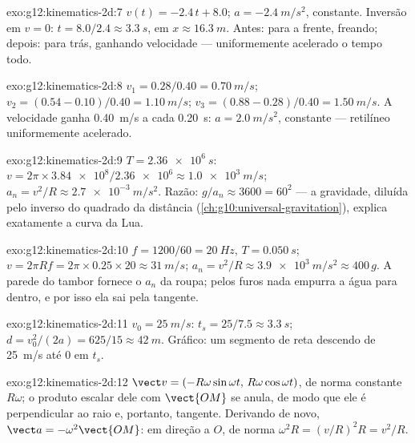 \begin{solution}{exo:g12:kinematics-2d:7}
$v(t) = -2.4\,t + 8.0$; $a = \qty{-2.4}{m/s^2}$, constante. Inversão em
$v = 0$: $t = 8.0/2.4 \approx \qty{3.3}{s}$, em
$x \approx \qty{16.3}{m}$. Antes: para a frente, freando; depois: para
trás, ganhando velocidade --- uniformemente acelerado o tempo todo.
\end{solution}

\begin{solution}{exo:g12:kinematics-2d:8}
$v_1 = 0.28/0.40 = \qty{0.70}{m/s}$;
$v_2 = (0.54 - 0.10)/0.40 = \qty{1.10}{m/s}$;
$v_3 = (0.88 - 0.28)/0.40 = \qty{1.50}{m/s}$. A velocidade ganha
\qty{0.40}{m/s} a cada \qty{0.20}{s}: $a = \qty{2.0}{m/s^2}$, constante
--- retilíneo uniformemente acelerado.
\end{solution}

\begin{solution}{exo:g12:kinematics-2d:9}
$T = \qty{2.36e6}{s}$:
$v = 2\pi \times \num{3.84e8}/\num{2.36e6} \approx \qty{1.0e3}{m/s}$;
$a_n = v^2/R \approx \qty{2.7e-3}{m/s^2}$. Razão:
$g/a_n \approx 3600 = 60^2$ --- a gravidade, diluída pelo inverso do
quadrado da distância (\cref{ch:g10:universal-gravitation}), explica
exatamente a curva da Lua.
\end{solution}

\begin{solution}{exo:g12:kinematics-2d:10}
$f = 1200/60 = \qty{20}{Hz}$, $T = \qty{0.050}{s}$;
$v = 2\pi R f = 2\pi \times 0.25 \times 20 \approx \qty{31}{m/s}$;
$a_n = v^2/R \approx \qty{3.9e3}{m/s^2} \approx 400\,g$. A parede do
tambor fornece o $a_n$ da roupa; pelos furos nada empurra a água para
dentro, e por isso ela sai pela tangente.
\end{solution}

\begin{solution}{exo:g12:kinematics-2d:11}
$v_0 = \qty{25}{m/s}$: $t_s = 25/7.5 \approx \qty{3.3}{s}$;
$d = v_0^2/(2a) = 625/15 \approx \qty{42}{m}$. Gráfico: um segmento de
reta descendo de \qty{25}{m/s} até $0$ em $t_s$.
\end{solution}

\begin{solution}{exo:g12:kinematics-2d:12}
$\vect v = (-R\omega\sin\omega t,\, R\omega\cos\omega t)$, de norma
constante $R\omega$; o produto escalar dele com $\vect{OM}$ se anula, de
modo que ele é perpendicular ao raio e, portanto, tangente. Derivando de
novo, $\vect a = -\omega^2\vect{OM}$: em direção a $O$, de norma
$\omega^2 R = (v/R)^2 R = v^2/R$.
\end{solution}

